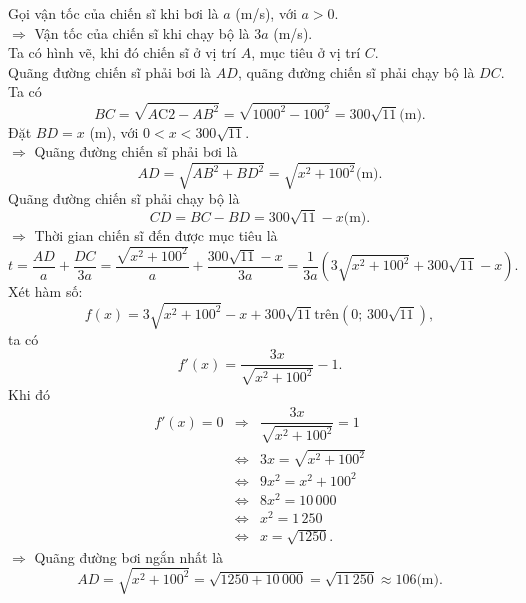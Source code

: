 \begin{ex}
{Gọi vận tốc của chiến sĩ khi bơi là $a$ (m/s), với $a > 0$.\\
$\Rightarrow$ Vận tốc của chiến sĩ khi chạy bộ là $3a$ (m/s).\\
Ta có hình vẽ, khi đó chiến sĩ ở vị trí $A$, mục tiêu ở vị trí $C$.\\
Quãng đường chiến sĩ phải bơi là $AD$, quãng đường chiến sĩ phải chạy bộ là $DC$.\\
Ta có
\[
BC=\sqrt{A\mathrm{C}2-AB^2}=\sqrt{1000^2-100^2}=300\sqrt{11} \text{(m)}.
\]
Đặt $BD=x$ (m), với $0 < x < 300\sqrt{11}$.\\
$\Rightarrow$ Quãng đường chiến sĩ phải bơi là
\[
AD=\sqrt{AB^2+BD^2}=\sqrt{x^2+100^2} \text{(m)}.
\]
Quãng đường chiến sĩ phải chạy bộ là
\[
CD=BC-BD=300\sqrt{11}-x \text{(m)}.
\]
$\Rightarrow$ Thời gian chiến sĩ đến được mục tiêu là
\[
t=\dfrac{AD}{a}+\dfrac{DC}{3a}=\dfrac{\sqrt{x^2+100^2}}{a}+\dfrac{300\sqrt{11}-x}{3a}
=\dfrac{1}{3a} \left( 3\sqrt{x^2+100^2}+300\sqrt{11}-x \right).
\]
Xét hàm số:
\[
f(x)=3\sqrt{x^2+100^2}-x+300\sqrt{11} \text{trên} \left(0;\, 300\sqrt{11}\right),
\]
ta có
\[
f'(x)=\dfrac{3x}{\sqrt{x^2+100^2}}-1.
\]
Khi đó \allowdisplaybreaks
\begin{eqnarray*}
f'(x)=0 &\Rightarrow& \dfrac{3x}{\sqrt{x^2+100^2}}=1\\
&\Leftrightarrow& 3x=\sqrt{x^2+100^2}\\
&\Leftrightarrow&  9x^2=x^2+100^2\\
&\Leftrightarrow&  8x^2=10\,000\\
&\Leftrightarrow&  x^2=1\,250\\
&\Leftrightarrow&  x=\sqrt{1250}.
\end{eqnarray*}
$\Rightarrow$ Quãng đường bơi ngắn nhất là
\[
AD=\sqrt{x^2+100^2}=\sqrt{1250+10\,000}=\sqrt{11\,250} \approx 106 \text{(m)}.
\]
}
\end{ex}


